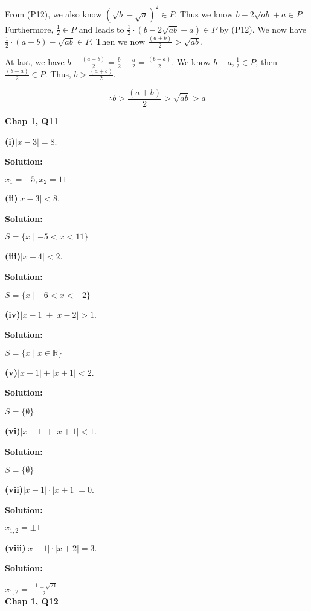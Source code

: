 \documentclass[a4paper,12pt]{report}
\begin{document}
From (P12), we also know $(\sqrt{b}-\sqrt{a})^{2}\in P$. Thus we know $b-2\sqrt{ab}+a\in P$. Furthermore, $\frac{1}{2}\in P$ and leads to $\frac{1}{2}\cdot{(b-2\sqrt{ab}+a)}\in P$ by (P12). We now have $\frac{1}{2}\cdot{(a+b)}-\sqrt{ab}\in P$. Then we now $\frac{(a+b)}{2}>\sqrt{ab}$.

At last, we have $b-\frac{(a+b)}{2}=\frac{b}{2}-\frac{a}{2}=\frac{(b-a)}{2}$. We know $b-a,\frac{1}{2} \in P$, then $\frac{(b-a)}{2}\in P$. Thus, $b>\frac{(a+b)}{2}$.

\[\therefore b>\frac{(a+b)}{2}>\sqrt{ab}>a\]

\noindent
\textbf{Chap 1, Q11}

\noindent
\textbf{(i)}$|x-3|=8$.

\noindent
\textbf{Solution:}

\noindent
$x_1=-5,x_2=11$

\noindent
\textbf{(ii)}$|x-3|<8$.

\noindent
\textbf{Solution:}

\noindent
$S=\{x \mid -5<x<11\}$

\noindent
\textbf{(iii)}$|x+4|<2$.

\noindent
\textbf{Solution:}

\noindent
$S=\{x \mid -6<x<-2\}$

\noindent
\textbf{(iv)}$|x-1| + |x-2|>1$.

\noindent
\textbf{Solution:}

\noindent
$S=\{x \mid x \in \mathbb{R}\}$

\noindent
\textbf{(v)}$|x-1| + |x+1|<2$.

\noindent
\textbf{Solution:}

\noindent
$S=\{\emptyset\}$

\noindent
\textbf{(vi)}$|x-1| + |x+1|<1$.

\noindent
\textbf{Solution:}

\noindent
$S=\{\emptyset\}$

\pagebreak
\noindent
\textbf{(vii)}$|x-1| \cdot{|x+1|} = 0$.

\noindent
\textbf{Solution:}

\noindent
$x_{1,2}=\pm1$

\noindent
\textbf{(viii)}$|x-1| \cdot{|x+2|} = 3$.

\noindent
\textbf{Solution:}

\noindent
$x_{1,2}=\frac{-1\pm\sqrt{21}}{2}$\\

\noindent
\textbf{Chap 1, Q12}
\end{document}
